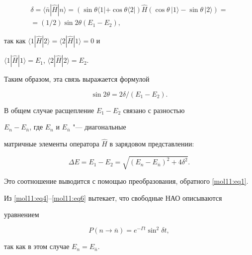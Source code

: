  \begin{multline*}

 \delta  = \langle \bar  n|\hat H|n \rangle = (\sin{\theta} \langle 1| + \cos{\theta} \langle 2|) \hat H

 (\cos{\theta}\, |1 \rangle - \sin{\theta} \, |2 \rangle) = \\

 =(1/2) \sin{2 \theta} (E_1 - E_2),

\end{multline*}

 так как  $\langle 1|\hat H|2 \rangle = \langle 2|\hat H|1 \rangle = 0$ и

$\langle 1|\hat H|1 \rangle = E_1$, $\langle 2|\hat H|2 \rangle =E_2$.

Таким образом, эта связь выражается формулой

  \begin{equation}

  \label{mol11:eq5}

 \sin {2 \theta} = {2 \delta}/({E_1 - E_2}).

   \end{equation}

 В общем случае расщепление  $E_1 - E_2$ связано с разностью

 $E_n - E_{\bar  n}$, где  $E_n$ и $E_{\bar  n}$ "--- диагональные

 матричные элементы оператора $\hat H$ в зарядовом представлении:

  \begin{equation}

  \label{mol11:eq6}

 \Delta E =  E_1 - E_2 = \sqrt{(E_n - E_{\bar  n})^2 + 4 \delta^2}.

   \end{equation}

 Это соотношение выводится с помощью преобразования, обратного \eqref{mol11:eq1}.



Из \eqref{mol11:eq4}--\eqref{mol11:eq6} вытекает, что свободные НАО описываются

уравнением

 \begin{equation} \label{mol11:eq7}

 P(n \to \bar  n) = e^{-\Gamma t} \sin^2 {\delta  t},

 \end{equation}

 так как в этом случае $E_n = E_{\bar  n}.$

